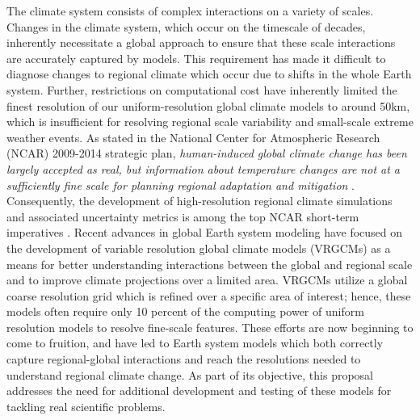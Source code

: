 \documentclass[11pt]{article}
\begin{document}
The climate system consists of complex interactions on a variety of scales. Changes in the climate system, which occur on the timescale of decades, inherently necessitate a global approach to ensure that these scale interactions are accurately captured by models. This requirement has made it difficult to diagnose changes to regional climate which occur due to shifts in the whole Earth system. Further, restrictions on computational cost have inherently limited the finest resolution of our uniform-resolution global climate models to around 50km, which is insufficient for resolving regional scale variability and small-scale extreme weather events. As stated in the National Center for Atmospheric Research (NCAR) 2009-2014 strategic plan, \textit{human-induced global climate change has been largely accepted as real, but information about temperature changes are not at a sufficiently fine scale for planning regional adaptation and mitigation} \citep{NCAR2009}. Consequently, the development of high-resolution regional climate simulations and associated uncertainty metrics is among the top NCAR short-term imperatives \citep{NCAR2009}. Recent advances in global Earth system modeling have focused on the development of variable resolution global climate models (VRGCMs) as a means for better understanding interactions between the global and regional scale and to improve climate projections over a limited area.  VRGCMs utilize a global coarse resolution grid which is refined over a specific area of interest; hence, these models often require only 10 percent of the computing power of uniform resolution models to resolve fine-scale features. These efforts are now beginning to come to fruition, and have led to Earth system models which both correctly capture regional-global interactions and reach the resolutions needed to understand regional climate change.   As part of its objective, this proposal addresses the need for additional development and testing of these models for tackling real scientific problems.
\end{document}

